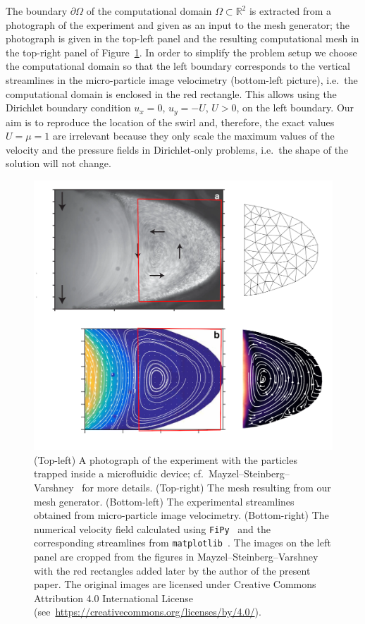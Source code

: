 \documentclass[12pt]{article}
\begin{document}
The boundary $\partial \Omega$ of the computational domain $\Omega \subset
\mathbb{R}^2$ is extracted from a photograph of the experiment and given as an
input to the mesh generator; the photograph is given in the top-left panel and
the resulting computational mesh in the top-right panel of
Figure~\ref{fig:esimerkki}.  In order to simplify the problem setup we choose
the computational domain so that the left boundary corresponds to the vertical
streamlines in the micro-particle image velocimetry (bottom-left picture),
i.e.~the computational domain is enclosed in the red rectangle.  This allows
using the Dirichlet boundary condition $u_x = 0$, $u_y = -U$, $U > 0$, on the
left boundary.  Our aim is to reproduce the location of the swirl and,
therefore, the exact values $U=\mu=1$ are irrelevant because they only scale the
maximum values of the velocity and the pressure fields in Dirichlet-only
problems, i.e.~the shape of the solution will not change.

\begin{figure}[htbp]
\centering
\includegraphics[width=\textwidth]{./esimerkki_vertailu.png}
\caption{(Top-left) A photograph of the experiment with the particles trapped
  inside a microfluidic device;
  cf.~Mayzel--Steinberg--Varshney~\cite{mayzel2019stokes} for more details.
  (Top-right) The mesh resulting from our mesh generator. (Bottom-left) The
  experimental streamlines obtained from micro-particle image velocimetry.
  (Bottom-right) The numerical velocity field calculated using
  \texttt{FiPy}~\cite{FiPy2009} and the corresponding streamlines from
  \texttt{matplotlib}~\cite{hunter2007matplotlib}.  The images on the left panel
  are cropped from the figures in
  Mayzel--Steinberg--Varshney~\cite{mayzel2019stokes} with the red rectangles
  added later by the author of the present paper.  The original images are
  licensed under Creative Commons Attribution 4.0 International License
  (see~\url{https://creativecommons.org/licenses/by/4.0/}).}
\label{fig:esimerkki}
\end{figure}
\end{document}
